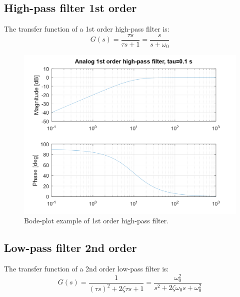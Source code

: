 \documentclass[]{book}
\begin{document}
\hypertarget{high-pass-filter-1st-order}{%
\subsection{High-pass filter 1st order}\label{high-pass-filter-1st-order}}

The transfer function of a 1st order high-pass filter is:
\[
G(s) =  \frac{\tau s}{\tau s + 1} = \frac{s}{s + \omega_0}
\label{eq:hpf1}
\]

\begin{figure}
\includegraphics[width=1\linewidth]{images/filters/hpf_1st} \caption{Bode-plot example of 1st order high-pass filter.}\label{fig:unnamed-chunk-2}
\end{figure}

\hypertarget{low-pass-filter-2nd-order}{%
\subsection{Low-pass filter 2nd order}\label{low-pass-filter-2nd-order}}

The transfer function of a 2nd order low-pass filter is:
\[
G(s) =  \frac{1}{(\tau s)^2 + 2\zeta \tau s + 1} = \frac{\omega_0^2}{s^2 + 2\zeta \omega_0 s + \omega_0^2}
\label{eq:lpf2}
\]
\end{document}
